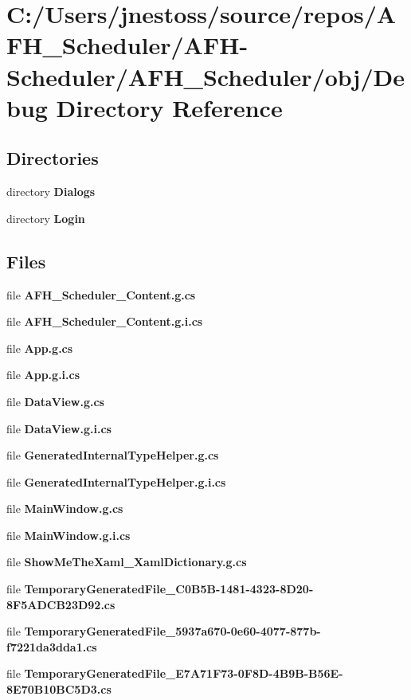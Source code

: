 \section{C\+:/\+Users/jnestoss/source/repos/\+A\+F\+H\+\_\+\+Scheduler/\+A\+F\+H-\/\+Scheduler/\+A\+F\+H\+\_\+\+Scheduler/obj/\+Debug Directory Reference}
\label{dir_a8671964b441fd4def286da79b221ed4}
\subsection*{Directories}
\begin{DoxyCompactItemize}
\item 
directory \textbf{ Dialogs}
\item 
directory \textbf{ Login}
\end{DoxyCompactItemize}
\subsection*{Files}
\begin{DoxyCompactItemize}
\item 
file \textbf{ A\+F\+H\+\_\+\+Scheduler\+\_\+\+Content.\+g.\+cs}
\item 
file \textbf{ A\+F\+H\+\_\+\+Scheduler\+\_\+\+Content.\+g.\+i.\+cs}
\item 
file \textbf{ App.\+g.\+cs}
\item 
file \textbf{ App.\+g.\+i.\+cs}
\item 
file \textbf{ Data\+View.\+g.\+cs}
\item 
file \textbf{ Data\+View.\+g.\+i.\+cs}
\item 
file \textbf{ Generated\+Internal\+Type\+Helper.\+g.\+cs}
\item 
file \textbf{ Generated\+Internal\+Type\+Helper.\+g.\+i.\+cs}
\item 
file \textbf{ Main\+Window.\+g.\+cs}
\item 
file \textbf{ Main\+Window.\+g.\+i.\+cs}
\item 
file \textbf{ Show\+Me\+The\+Xaml\+\_\+\+Xaml\+Dictionary.\+g.\+cs}
\item 
file \textbf{ Temporary\+Generated\+File\+\_\+C0\+B5\+B-\/1481-\/4323-\/8\+D20-\/8\+F5\+A\+D\+C\+B23\+D92.\+cs}
\item 
file \textbf{ Temporary\+Generated\+File\+\_\+5937a670-\/0e60-\/4077-\/877b-\/f7221da3dda1.\+cs}
\item 
file \textbf{ Temporary\+Generated\+File\+\_\+\+E7\+A71\+F73-\/0\+F8\+D-\/4\+B9\+B-\/\+B56\+E-\/8\+E70\+B10\+B\+C5\+D3.\+cs}
\end{DoxyCompactItemize}
